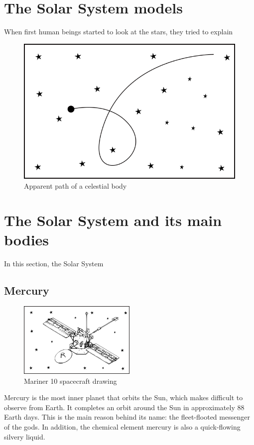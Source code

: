 \section{The Solar System models}

When first human beings started to look at the stars, they tried to explain 

\begin{figure}[h]
	\centering
	\includegraphics[scale=0.75]{figs/sky_path.png}
	\caption{Apparent path of a celestial body}
\end{figure}


\newpage
\section{The Solar System and its main bodies}
In this section, the Solar System 

\newpage
\subsection{Mercury}
\begin{figure}
	\begin{center}
		\includegraphics[width=0.5\textwidth]{figs/spacecraft/mariner10.png}
	\end{center}
	\caption{Mariner 10 spacecraft drawing}
\end{figure}
Mercury is the most inner planet that orbits the Sun, which makes difficult to observe from Earth. It completes an orbit around the Sun in approximately 88 Earth days. This is the main reason behind its name: the fleet-flooted messenger of the gods. In addition, the chemical element mercury is also a quick-flowing silvery liquid.\\


